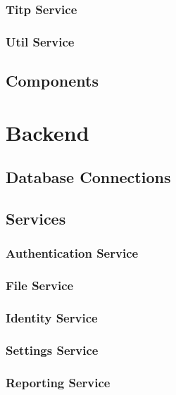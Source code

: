 \subsubsection{Titp Service}

\subsubsection{Util Service}

\subsection{Components}

\section{Backend}

\subsection{Database Connections}

\subsection{Services}

\subsubsection{Authentication Service}

\subsubsection{File Service}

\subsubsection{Identity Service}

\subsubsection{Settings Service}

\subsubsection{Reporting Service}

